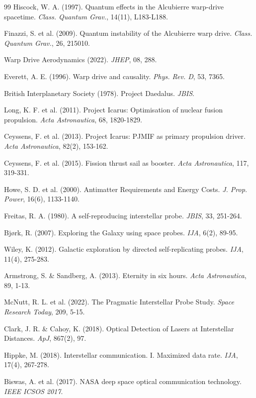 \documentclass[11pt,a4paper,onecolumn]{article}
\begin{document}
\begin{thebibliography}{99}
 Hiscock, W. A. (1997). Quantum effects in the Alcubierre warp-drive spacetime. \textit{Class. Quantum Grav.}, 14(11), L183-L188.

 Finazzi, S. et al. (2009). Quantum instability of the Alcubierre warp drive. \textit{Class. Quantum Grav.}, 26, 215010.

 Warp Drive Aerodynamics (2022). \textit{JHEP}, 08, 288.

 Everett, A. E. (1996). Warp drive and causality. \textit{Phys. Rev. D}, 53, 7365.

 British Interplanetary Society (1978). Project Daedalus. \textit{JBIS}.

 Long, K. F. et al. (2011). Project Icarus: Optimisation of nuclear fusion propulsion. \textit{Acta Astronautica}, 68, 1820-1829.

 Ceyssens, F. et al. (2013). Project Icarus: PJMIF as primary propulsion driver. \textit{Acta Astronautica}, 82(2), 153-162.

 Ceyssens, F. et al. (2015). Fission thrust sail as booster. \textit{Acta Astronautica}, 117, 319-331.

 Howe, S. D. et al. (2000). Antimatter Requirements and Energy Costs. \textit{J. Prop. Power}, 16(6), 1133-1140.

 Freitas, R. A. (1980). A self-reproducing interstellar probe. \textit{JBIS}, 33, 251-264.

 Bj{\o}rk, R. (2007). Exploring the Galaxy using space probes. \textit{IJA}, 6(2), 89-95.

 Wiley, K. (2012). Galactic exploration by directed self-replicating probes. \textit{IJA}, 11(4), 275-283.

 Armstrong, S. \& Sandberg, A. (2013). Eternity in six hours. \textit{Acta Astronautica}, 89, 1-13.

 McNutt, R. L. et al. (2022). The Pragmatic Interstellar Probe Study. \textit{Space Research Today}, 209, 5-15.

 Clark, J. R. \& Cahoy, K. (2018). Optical Detection of Lasers at Interstellar Distances. \textit{ApJ}, 867(2), 97.

 Hippke, M. (2018). Interstellar communication. I. Maximized data rate. \textit{IJA}, 17(4), 267-278.

 Biswas, A. et al. (2017). NASA deep space optical communication technology. \textit{IEEE ICSOS 2017}.


\end{thebibliography}
\end{document}
